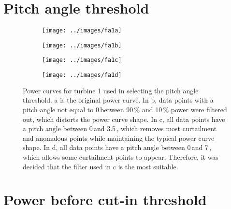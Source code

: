 \chapter{Pitch angle threshold}\label{a1}

\begin{figure}
  \centering
  \begin{subfigure}[t]{.5\textwidth}
    \centering
    \texttt{[image: ../images/fa1a]}
    \caption{}
  \end{subfigure}
  \begin{subfigure}[t]{.5\textwidth}
    \centering
    \texttt{[image: ../images/fa1b]}
    \caption{}
  \end{subfigure}
  \begin{subfigure}[t]{.49\textwidth}
    \centering
    \texttt{[image: ../images/fa1c]}
    \caption{}
  \end{subfigure}
  \begin{subfigure}[t]{.49\textwidth}
    \centering
    \texttt{[image: ../images/fa1d]}
    \caption{}
  \end{subfigure}
  \captionsetup{labelformat=empty,list=no}
  \caption{Power curves for turbine 1 used in selecting the pitch angle
  threshold. a is the original power curve. In b, data points with a pitch
  angle not equal to 0\,\textdegree between 90\,\% and 10\,\% power were
  filtered out, which distorts the power curve shape. In c, all data points
  have a pitch angle between 0\,\textdegree and 3.5\,\textdegree, which
  removes most curtailment and anomalous points while maintaining the typical
  power curve shape. In d, all data points have a pitch angle between
  0\,\textdegree and 7\,\textdegree, which allows some curtailment points to
  appear. Therefore, it was decided that the filter used in c is the most
  suitable.}
\end{figure}

\chapter{Power before cut-in threshold}\label{a2}

